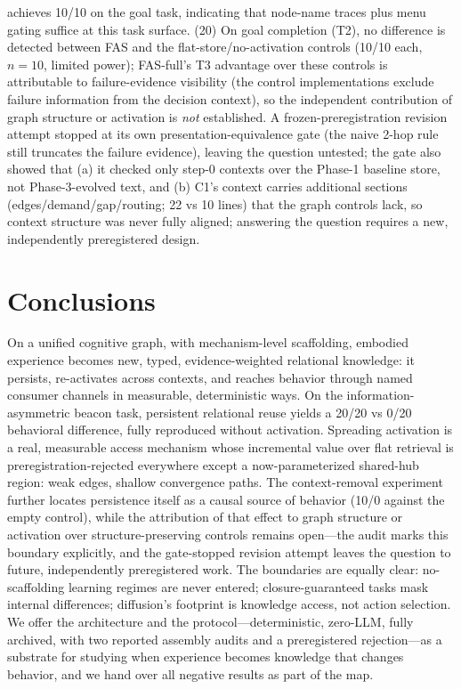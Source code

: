 \documentclass[10pt]{article}
\begin{document}
achieves 10/10 on the goal task, indicating that node-name traces plus menu gating suffice at this task surface. (20) On goal completion (T2), no difference is detected between FAS and the flat-store/no-activation controls (10/10 each, $n{=}10$, limited power); FAS-full's T3 advantage over these controls is attributable to failure-evidence visibility (the control implementations exclude failure information from the decision context), so the independent contribution of graph structure or activation is \emph{not} established. A frozen-preregistration revision attempt stopped at its own presentation-equivalence gate (the naive 2-hop rule still truncates the failure evidence), leaving the question untested; the gate also showed that (a) it checked only step-0 contexts over the Phase-1 baseline store, not Phase-3-evolved text, and (b) C1's context carries additional sections (edges/demand/gap/routing; 22 vs 10 lines) that the graph controls lack, so context structure was never fully aligned; answering the question requires a new, independently preregistered design.

\section{Conclusions}
On a unified cognitive graph, with mechanism-level scaffolding, embodied experience becomes new, typed, evidence-weighted relational knowledge: it persists, re-activates across contexts, and reaches behavior through named consumer channels in measurable, deterministic ways. On the information-asymmetric beacon task, persistent relational reuse yields a 20/20 vs 0/20 behavioral difference, fully reproduced without activation. Spreading activation is a real, measurable access mechanism whose incremental value over flat retrieval is preregistration-rejected everywhere except a now-parameterized shared-hub region: weak edges, shallow convergence paths. The context-removal experiment further locates persistence itself as a causal source of behavior (10/0 against the empty control), while the attribution of that effect to graph structure or activation over structure-preserving controls remains open---the audit marks this boundary explicitly, and the gate-stopped revision attempt leaves the question to future, independently preregistered work. The boundaries are equally clear: no-scaffolding learning regimes are never entered; closure-guaranteed tasks mask internal differences; diffusion's footprint is knowledge access, not action selection. We offer the architecture and the protocol---deterministic, zero-LLM, fully archived, with two reported assembly audits and a preregistered rejection---as a substrate for studying when experience becomes knowledge that changes behavior, and we hand over all negative results as part of the map.
\end{document}
